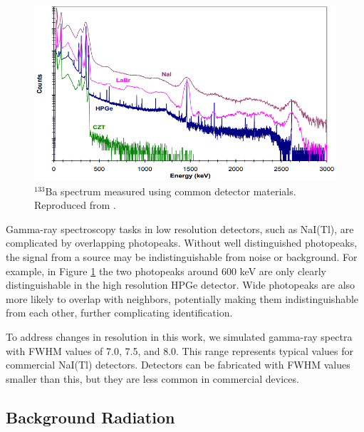 \begin{figure}[H]
\centering
\includegraphics[trim=0 0 0 0, clip, width=1.0\linewidth]{images/Ba133_spectrum_different_detector_materials_Market_Survey_Report}
\caption{$^{133}$Ba spectrum measured using common detector materials. Reproduced from \cite{RIIDMarketSurveyReport}.}
\label{fig:Ba133_spectrum_different_detector_materials_Market_Survey_Report}
\end{figure}

Gamma-ray spectroscopy tasks in low resolution detectors, such as NaI(Tl), are complicated by overlapping photopeaks. Without well distinguished photopeaks, the signal from a source may be indistinguishable from noise or background. For example, in Figure \ref{fig:Ba133_spectrum_different_detector_materials_Market_Survey_Report} the two photopeaks around 600 keV are only clearly distinguishable in the high resolution HPGe detector. Wide photopeaks are also more likely to overlap with neighbors, potentially making them indistinguishable from each other, further complicating identification.

To address changes in resolution in this work, we simulated gamma-ray spectra with FWHM values of 7.0, 7.5, and 8.0. This range represents typical values for commercial NaI(Tl) detectors. Detectors can be fabricated with FWHM values smaller than this, but they are less common in commercial devices.

\subsection{Background Radiation}


